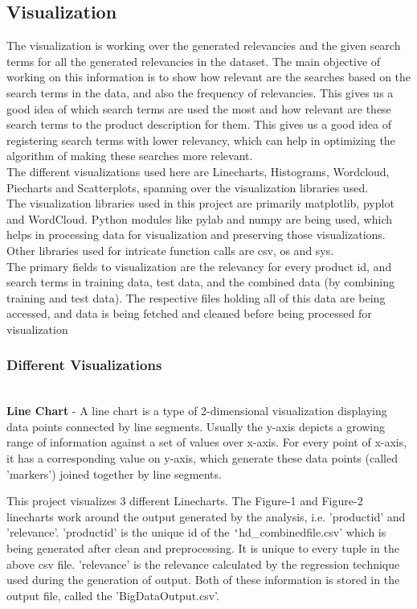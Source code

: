 \documentclass{sig-alternate-05-2015}
\begin{document}
\newline

\subsection{Visualization}
The visualization is working over the generated relevancies and the given search terms for all the generated relevancies in the dataset. The main objective of working on this information is to show how relevant are the searches based on the search terms in the data, and also the frequency of relevancies. This gives us a good idea of which search terms are used the most and how relevant are these search terms to the product description for them. This gives us a good idea of registering search terms with lower relevancy, which can help in optimizing the algorithm of making these searches more relevant.\\
The different visualizations used here are Linecharts, Histograms, Wordcloud, Piecharts and Scatterplots, spanning over the visualization libraries used.\\
The visualization libraries used in this project are primarily matplotlib, pyplot and WordCloud. Python modules like pylab and numpy are being used, which helps in processing data for visualization and preserving those visualizations. Other libraries used for intricate function calls are csv, os and sys. \\

The primary fields to visualization are the relevancy for every product id, and search terms in training data, test data, and the combined data (by combining training and test data). The respective files holding all of this data are being accessed, and data is being fetched and cleaned before being processed for visualization

\subsubsection{Different Visualizations}\\
\textbf{Line Chart} - A line chart is a type of 2-dimensional visualization displaying data points connected by line segments. Usually the y-axis depicts a growing range of information against a set of values over x-axis. For every point of x-axis, it has a corresponding value on y-axis, which generate these data points (called 'markers') joined together by line segments. \cite{www-wikiLine}


This project visualizes 3 different Linecharts.
The Figure-1 and Figure-2 linecharts work around the output generated by the analysis, i.e. 'productid' and 'relevance'. 'productid' is the unique id of the \texttt'{hd\_combinedfile.csv}' which is being generated after clean and preprocessing. It is unique to every tuple in the above csv file. 'relevance' is the relevance calculated by the regression technique used during the generation of output. Both of these information is stored in the output file, called the 'BigDataOutput.csv'.
\end{document}
